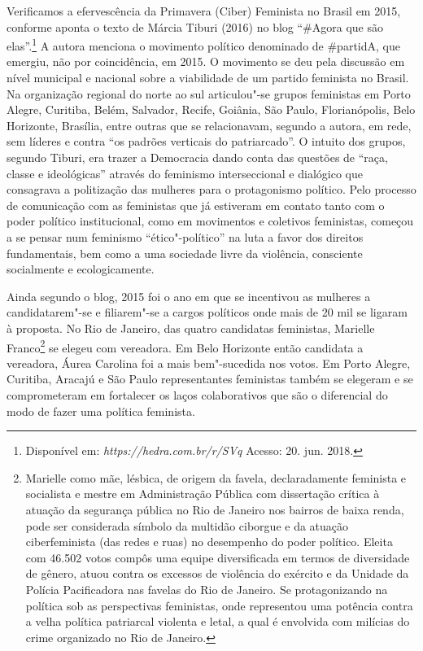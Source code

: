 Verificamos a efervescência da Primavera (Ciber) Feminista no Brasil em
2015, conforme aponta o texto de Márcia Tiburi (2016) no blog ``\#Agora
que são elas''.\footnote{Disponível em:
  \emph{https://hedra.com.br/r/SVq}
  Acesso: 20. jun. 2018.} A autora menciona o movimento político
denominado de \#partidA, que emergiu, não por coincidência, em 2015. O
movimento se deu pela discussão em nível municipal e nacional sobre a
viabilidade de um partido feminista no Brasil. Na organização regional
do norte ao sul articulou"-se grupos feministas em Porto Alegre,
Curitiba, Belém, Salvador, Recife, Goiânia, São Paulo, Florianópolis,
Belo Horizonte, Brasília, entre outras que se relacionavam, segundo a
autora, em rede, sem líderes e contra ``os padrões verticais do
patriarcado''. O intuito dos grupos, segundo Tiburi, era trazer a
Democracia dando conta das questões de ``raça, classe e ideológicas''
através do feminismo interseccional e dialógico que consagrava a
politização das mulheres para o protagonismo político. Pelo processo de
comunicação com as feministas que já estiveram em contato tanto com o
poder político institucional, como em movimentos e coletivos feministas,
começou a se pensar num feminismo ``ético"-político'' na luta a favor dos
direitos fundamentais, bem como a uma sociedade livre da violência,
consciente socialmente e ecologicamente.

Ainda segundo o blog, 2015 foi o ano em que se incentivou as mulheres a
candidatarem"-se e filiarem"-se a cargos políticos onde mais de 20 mil se
ligaram à proposta. No Rio de Janeiro, das quatro candidatas feministas,
Marielle Franco\footnote{Marielle como mãe, lésbica, de origem da
  favela, declaradamente feminista e socialista e mestre em
  Administração Pública com dissertação crítica à atuação da segurança
  pública no Rio de Janeiro nos bairros de baixa renda, pode ser
  considerada símbolo da multidão ciborgue e da atuação ciberfeminista
  (das redes e ruas) no desempenho do poder político. Eleita com 46.502
  votos compôs uma equipe diversificada em termos de diversidade de
  gênero, atuou contra os excessos de violência do exército e da Unidade
  da Polícia Pacificadora nas favelas do Rio de Janeiro. Se
  protagonizando na política sob as perspectivas feministas, onde
  representou uma potência contra a velha política patriarcal violenta e
  letal, a qual é envolvida com milícias do crime organizado no Rio de
  Janeiro.} se elegeu com vereadora. Em Belo Horizonte então candidata a
vereadora, Áurea Carolina foi a mais bem"-sucedida nos votos. Em Porto
Alegre, Curitiba, Aracajú e São Paulo representantes feministas também
se elegeram e se comprometeram em fortalecer os laços colaborativos que
são o diferencial do modo de fazer uma política feminista.

